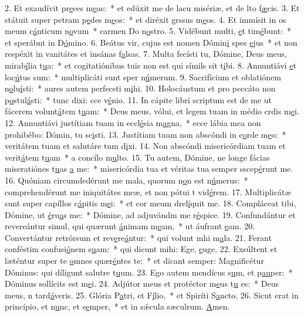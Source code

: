 2. Et exaudívit pr\uline{e}ces m\uline{e}as:~* et edúxit me de lacu misériæ, et de lto f\uline{æ}cis.
3. Et státuit super petram p\uline{e}des m\uline{e}os:~* et diréxit grssus m\uline{e}os.
4. Et immísit in os meum c\uline{á}nticum n\uline{o}vum~* carmen Do n\uline{o}stro.
5. Vidébunt multi, \uline{e}t tim\uline{é}bunt:~* et sperábnt in D\uline{ó}mino.
6. Beátus vir, cujus est nomen Dómin\uline{i} spes \uline{e}jus~* et non respéxit in vanitátes et insánas f\uline{a}lsas.
7. Multa fecísti tu, Dómine, Deus meus, mirab\uline{í}lia t\uline{u}a:~* et cogitatiónibus tuis non est qui símils sit t\uline{i}bi.
8. Annuntiávi \uline{e}t loc\uline{ú}tus sum:~* multiplicáti sunt sper n\uline{ú}merum.
9. Sacrifícium et oblatiónem n\uline{o}lu\uline{í}sti:~* aures autem perfecsti m\uline{i}hi.
10. Holocáustum et pro peccáto non p\uline{o}stul\uline{á}sti:~* tunc dixi: cce v\uline{é}nio.
11. In cápite libri scriptum est de me ut fácerem volunt\uline{á}tem t\uline{u}am:~* Deus meus, vólui, et legem tuam in médio crdis m\uline{e}i.
12. Annuntiávi justítiam tuam in eccl\uline{é}sia m\uline{a}gna,~* ecce lábia mea non prohibébo: Dómin, tu sc\uline{i}sti.
13. Justítiam tuam non abscóndi in c\uline{o}rde m\uline{e}o:~* veritátem tuam et salutáre tum d\uline{i}xi.
14. Non abscóndi misericórdiam tuam et verit\uline{á}tem t\uline{u}am~* a concílo m\uline{u}lto.
15. Tu autem, Dómine, ne longe fácias miseratiónes t\uline{u}as \uline{a} me:~* misericórdia tua et véritas tua semper sscep\uline{é}runt me.
16. Quóniam circumdedérunt me mala, quorum n\uline{o}n est n\uline{ú}merus:~* comprehendérunt me iniquitátes meæ, et non pótui t vid\uline{é}rem.
17. Multiplicátæ sunt super capíllos c\uline{á}pitis m\uline{e}i:~* et cor meum drel\uline{í}quit me.
18. Compláceat tibi, Dómine, ut \uline{é}ru\uline{a}s me:~* Dómine, ad adjuvándm me r\uline{é}spice.
19. Confundántur et revereántur simul, qui quærunt \uline{á}nimam m\uline{e}am,~* ut áufrant \uline{e}am.
20. Convertántur retrórsum et rev\uline{e}re\uline{á}ntur:~* qui volunt mhi m\uline{a}la.
21. Ferant conféstim confusi\uline{ó}nem s\uline{u}am:~* qui dicunt mihi: Ege, \uline{e}uge.
22. Exsúltent et læténtur super te \uline{o}mnes quær\uline{é}ntes te:~* et dicant semper: Magnificétur Dóminus: qui díligunt salutre t\uline{u}um.
23. Ego autem mendícus s\uline{u}m, et p\uline{au}per:~* Dóminus sollícits est m\uline{e}i.
24. Adjútor meus et protéctor m\uline{e}us t\uline{u} es:~* Deus meus, n tard\uline{á}veris.
25. Glória P\uline{a}tri, et F\uline{í}lio,~* et Spiríti S\uline{a}ncto.
26. Sicut erat in princípio, et n\uline{u}nc, et s\uline{e}mper,~* et in sǽcula sæculrum. \uline{A}men.
